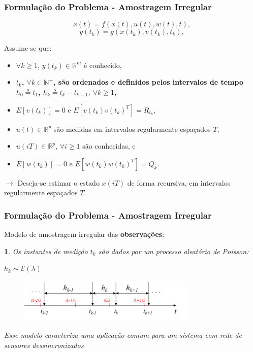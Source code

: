 \documentclass{beamer}
\renewcommand{\(}{\left(}
\renewcommand{\)}{\right)}
\renewcommand{\[}{\left[}
\renewcommand{\]}{\right]}
\newtheorem{definicao}{}
\begin{document}
\begin{frame}
	\frametitle{Formulação do Problema  - Amostragem Irregular}
	
	\begin{equation*}\label{eq:processo}
	\dot{x}(t)=f(x(t),u(t),w(t),t),
	\end{equation*}
	\begin{equation*}\label{eq:obs}
	y(t_k)=g(x(t_k),v(t_k),t_k),
	\end{equation*}

	
	Assume-se que:
	
	\begin{itemize}
		\item $\forall k \geq 1$, $y(t_k) \in \mathbb{R}^m$ é conhecido,
		\item \textbf{$t_k$, $\forall k \in \mathbb{N^+}$, são ordenados e definidos pelos intervalos de tempo $h_0 \triangleq t_1$, $h_k \triangleq t_k-t_{k-1}, \ \forall k \geq 1$,}
		\item $E[v(t_k)]=0$ e $E[v(t_k)v(t_k)^T]=R_{t_k}$,
		\item $u(t) \in \mathbb{R}^p$ são medidas em intervalos regularmente espaçados $T$,
		\item $u(iT) \in \mathbb{R}^p$, $\forall i \geq 1$ são conhecidas, e
		\item $E[w(t_k)]=0$ e $E[w(t_k)w(t_k)^T]=Q_k$.
	\end{itemize}
	
	\vspace{0.25cm}
	
	$\rightarrow$ Deseja-se estimar o estado $x(iT)$ de forma recursiva, em intervalos regularmente espaçados $T$.

\end{frame}


\begin{frame}
	\frametitle{Formulação do Problema - Amostragem Irregular}
	Modelo de amostragem irregular das \textbf{observações}:
	
	\begin{definicao}
		Os instantes de medição $t_k$ são dados por um processo aleatório de Poisson:
		
		\centering
		$h_k \sim \mathcal{E} (\lambda)$
	\end{definicao}
	
	\begin{figure}
		\centering
		\includegraphics[width=0.75\textwidth]{images/processo_amost.png}
	\end{figure}
	
	\small
	\centering
	\textit{Esse modelo caracteriza uma aplicação comum para um sistema com rede de sensores dessincronizados} \autocite{Micheli2002}

\end{frame}
\end{document}
